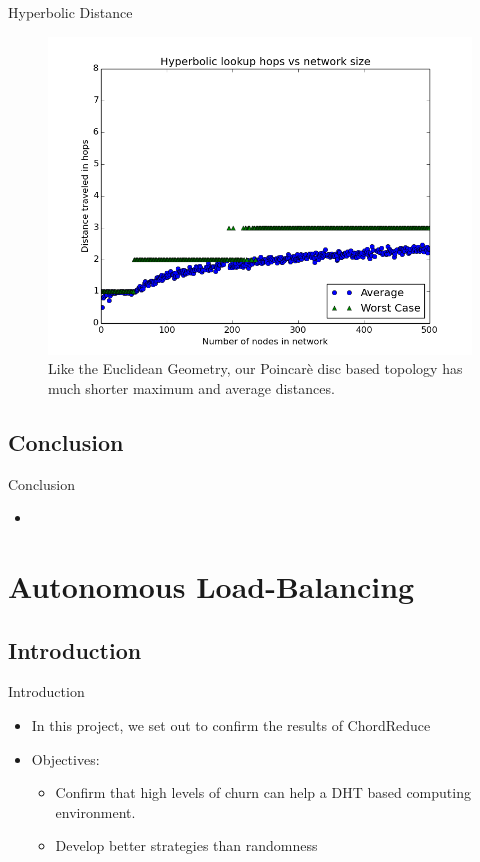 \documentclass[11pt]{beamer}
\begin{document}
\begin{frame}{Hyperbolic Distance}
	\begin{figure}
		\centering
		\includegraphics[width=0.7\linewidth]{figs/HyperbolicDistance}
		\caption[Hops in Hyperbolic UrDHT]{Like the Euclidean Geometry, our Poincar\`{e} disc based topology has much shorter maximum and average distances.
		}
		\label{fig:HyperbolicDistance}
	\end{figure}
\end{frame}
	







\subsection{Conclusion}

\begin{frame}{Conclusion}
\begin{itemize}
	\item 
\end{itemize}
\end{frame}

\section{Autonomous Load-Balancing}

\subsection{Introduction}
\begin{frame}{Introduction}
	\begin{itemize}
		
		\item In this project, we set out to confirm the results of ChordReduce
		\item Objectives:
		\begin{itemize}
			\item Confirm that high levels of churn can help a DHT based computing environment.
			\item Develop better strategies than randomness
		\end{itemize}
	\end{itemize}
\end{frame}
\end{document}
